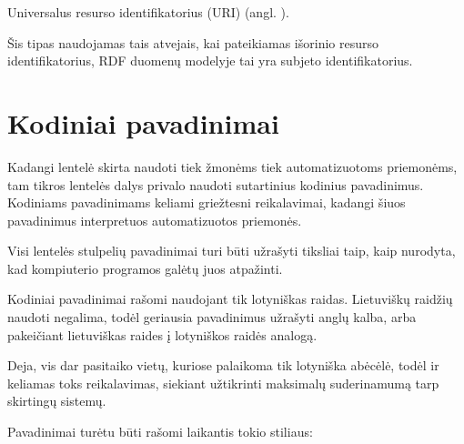 \documentclass[letterpaper,10pt,lithuanian]{sphinxmanual}
\begin{document}

\begin{fulllineitems}
\label{\detokenize{tipai:type.uri}}
\pysigstartsignatures
\pysigline
{}
\pysigstopsignatures
\sphinxAtStartPar
Universalus resurso identifikatorius (URI) (angl. ).

\sphinxAtStartPar
Šis tipas naudojamas tais atvejais, kai pateikiamas išorinio resurso
identifikatorius, RDF duomenų modelyje tai yra subjeto identifikatorius.

\sphinxAtStartPar
{}

\end{fulllineitems}


\sphinxstepscope


\section{Kodiniai pavadinimai}
\label{\detokenize{pavadinimai:kodiniai-pavadinimai}}\label{\detokenize{pavadinimai:id1}}\label{\detokenize{pavadinimai::doc}}
\sphinxAtStartPar
Kadangi {\hyperref[\detokenize{savokos:term-DSA}]{}} lentelė skirta naudoti tiek žmonėms tiek automatizuotoms
priemonėms, tam tikros lentelės dalys privalo naudoti sutartinius kodinius
pavadinimus. Kodiniams pavadinimams keliami griežtesni reikalavimai, kadangi
šiuos pavadinimus interpretuos automatizuotos priemonės.

\sphinxAtStartPar
Visi {\hyperref[\detokenize{savokos:term-DSA}]{}} lentelės stulpelių pavadinimai turi būti užrašyti tiksliai
taip, kaip nurodyta, kad kompiuterio programos galėtų juos atpažinti.

\sphinxAtStartPar
Kodiniai pavadinimai rašomi naudojant tik lotyniškas raidas. Lietuviškų
raidžių naudoti negalima, todėl geriausia pavadinimus užrašyti anglų kalba,
arba pakeičiant lietuviškas raides į lotyniškos raidės analogą.

\sphinxAtStartPar
Deja, vis dar pasitaiko vietų, kuriose palaikoma tik lotyniška abėcėlė, todėl
ir keliamas toks reikalavimas, siekiant užtikrinti maksimalų suderinamumą
tarp skirtingų sistemų.

\sphinxAtStartPar
Pavadinimai turėtu būti rašomi laikantis tokio stiliaus:
\end{document}
